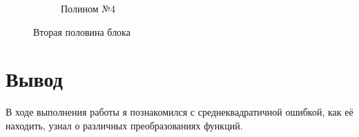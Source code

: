 \documentclass[14pt,a4paper]{extarticle}
\begin{document}
\begin{figure}[ht!]
\begin{subfigure}{.5\textwidth}
        \caption{Полином №4}
        \label{fig:3.4-4}
    \end{subfigure}%
    \caption{Вторая половина блока}
    \label{fig:3.4block2-2}
\end{figure}

\section*{Вывод}

        В ходе выполнения работы я познакомился с среднеквадратичной
ошибкой, как её находить, узнал о различных преобразованиях функций.
\end{document}
